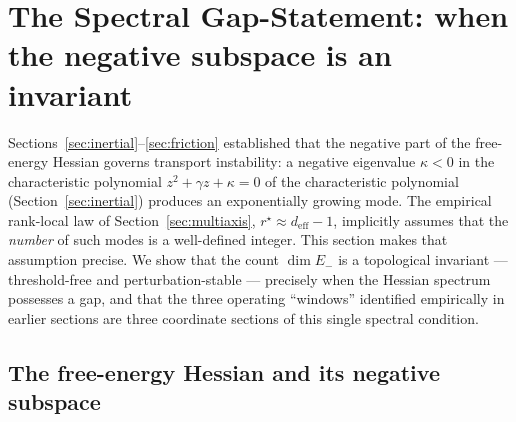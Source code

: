 
\section{The Spectral Gap-Statement: when the negative subspace is an invariant}
\label{sec:gap}

Sections~\ref{sec:inertial}--\ref{sec:friction} established that the negative
part of the free-energy Hessian governs transport instability: a negative
eigenvalue $\kappa<0$ in the characteristic polynomial $z^2+\gamma z+\kappa=0$
of the characteristic polynomial (Section~\ref{sec:inertial}) produces an exponentially growing mode. The empirical
rank-local law of Section~\ref{sec:multiaxis}, $r^\star \approx d_{\mathrm{eff}}-1$,
implicitly assumes that the \emph{number} of such modes is a well-defined
integer. This section makes that assumption precise. We show that the count
$\dim E_-$ is a topological invariant --- threshold-free and perturbation-stable
--- precisely when the Hessian spectrum possesses a gap, and that the three
operating ``windows'' identified empirically in earlier sections are three
coordinate sections of this single spectral condition.

\subsection{The free-energy Hessian and its negative subspace}
\label{sec:gap:hessian}

